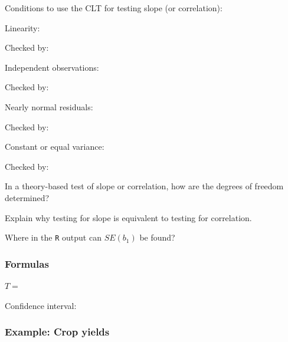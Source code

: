 \documentclass[
]{report}
\newcommand{\rgs}{\vspace{12pt}} %
\newcommand{\rgi}{\hspace{24pt}}  %
\begin{document}
Conditions to use the CLT for testing slope (or correlation):

\rgi Linearity:
\rgs

\rgi \rgi Checked by:
\rgs

\rgi Independent observations:
\rgs

\rgi \rgi Checked by:
\rgs

\rgi Nearly normal residuals:
\rgs

\rgi \rgi Checked by:
\rgs

\rgi Constant or equal variance:
\rgs

\rgi \rgi Checked by:
\rgs

In a theory-based test of slope or correlation, how are the degrees of freedom determined?
\rgs    

Explain why testing for slope is equivalent to testing for correlation.
\rgs

Where in the \texttt{R} output can \(SE(b_1)\) be found?
\rgs

\hypertarget{formulas-8}{%
\subsubsection*{Formulas}\label{formulas-8}}

\(T=\)
\rgs

Confidence interval:
\rgs

\hypertarget{example-crop-yields}{%
\subsubsection*{Example: Crop yields}\label{example-crop-yields}}
\end{document}
